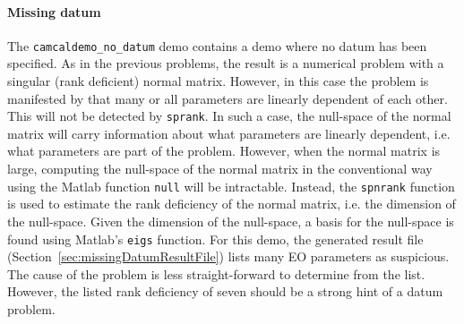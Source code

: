 \documentclass{article}
\begin{document}
\paragraph{Missing datum}

The \texttt{camcaldemo\_no\_datum} demo contains a demo where no datum
has been specified. As in the previous problems, the result is a
numerical problem with a singular (rank deficient) normal matrix.
However, in this case the problem is manifested by that many or all
parameters are linearly dependent of each other. This will not be
detected by \texttt{sprank}. In such a case, the null-space of the
normal matrix will carry information about what parameters are
linearly dependent, i.e. what parameters are part of the problem.
However, when the normal matrix is large, computing the null-space of
the normal matrix in the conventional way using the Matlab function
\texttt{null} will be intractable. Instead, the \texttt{spnrank}
\citep{Foster2009:Calculating} function is used to estimate the rank
deficiency of the normal matrix, i.e. the dimension of the null-space.
Given the dimension of the null-space, a basis for the null-space is
found using Matlab's \texttt{eigs} function. For this demo, the
generated result file (Section~\ref{sec:missingDatumResultFile}) lists
many EO parameters as suspicious. The cause of the problem is less
straight-forward to determine from the list. However, the listed rank
deficiency of seven should be a strong hint of a datum problem.
\end{document}
